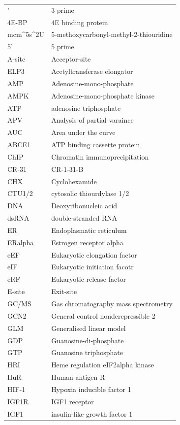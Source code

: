 \documentclass[12pt,openany]{book}
\begin{document}
\begin{longtable}{ll}
\endfoot
\bottomrule
\endlastfoot
3' & 3 prime\\
4E-BP & 4E binding protein\\
mcm\textasciicircum{}5s\textasciicircum{}2U & 5-methoxycarbonyl-methyl-2-thiouridine\\
5' & 5 prime\\
A-site & Acceptor-site\\
\addlinespace
ELP3 & Acetyltransferase elongator\\
AMP & Adenosine-mono-phosphate\\
AMPK & Adenosine-mono-phosphate
kinase\\
ATP & adenosine triphosphate\\
APV & Analysis of partial varaince\\
\addlinespace
AUC & Area under the curve\\
ABCE1 & ATP binding cassette protein\\
ChIP & Chromatin immunoprecipitation\\
CR-31 & CR-1-31-B\\
CHX & Cyclohexamide\\
\addlinespace
CTU1/2 & cytosolic thiourdylase 1/2\\
DNA & Deoxyribonucleic acid\\
dsRNA & double-stranded RNA\\
ER & Endoplasmatic reticulum\\
ERalpha & Estrogen receptor alpha\\
\addlinespace
eEF & Eukaryotic elongation factor\\
eIF & Eukaryotic initiation facotr\\
eRF & Eukaryotic release factor\\
E-site & Exit-site\\
GC/MS & Gas chromatography
mass spectrometry\\
\addlinespace
GCN2 & General control nonderepressible 2\\
GLM & Generalised linear model\\
GDP & Guanosine-di-phosphate\\
GTP & Guanosine triphosphate\\
HRI & Heme regulation eIF2alpha kinase\\
\addlinespace
HuR & Human antigen R\\
HIF-1 & Hypoxia inducible factor 1\\
IGF1R & IGF1 receptor\\
IGF1 & insulin-like growth factor 1\\

\end{longtable}
\end{document}
